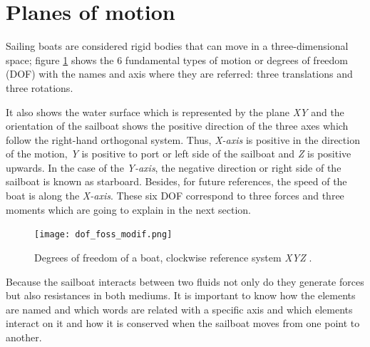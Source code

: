 \section{Planes of motion} \label{sec:planes_motio}
Sailing boats are considered rigid bodies that can move in a three-dimensional space; figure \ref{DOF} shows the 6 fundamental types of motion or degrees of freedom (DOF)  with the names and axis where they are referred: three translations and three rotations. \par 
It also shows the water surface which is represented by the plane \textit{XY} and the orientation of the sailboat shows the positive direction of the three axes which follow the right-hand orthogonal system. Thus, \textit{X-axis} is positive in the direction of the motion, \textit{Y} is positive to port or left side of the sailboat and \textit{Z} is positive upwards. In the case of the \textit{Y-axis}, the negative direction or right side of the sailboat is known as starboard.  Besides, for future references, the speed of the boat is along the \textit{X-axis}. These six DOF correspond to three forces and three moments which are going to explain in the next section. \par 
\begin{figure} %
\centering
  \texttt{[image: dof\_foss\_modif.png]}
 \caption{Degrees of freedom of a boat, clockwise reference system \textit{XYZ} \cite{fossati2009aero}. }
\label{DOF}
\end{figure}


Because the sailboat interacts between two fluids not only do they generate forces but also resistances in both mediums. It is important to know how the elements are named and which words are related with a specific axis and  %
which elements interact on it and how it is conserved when the sailboat moves from one point to another. \par 

